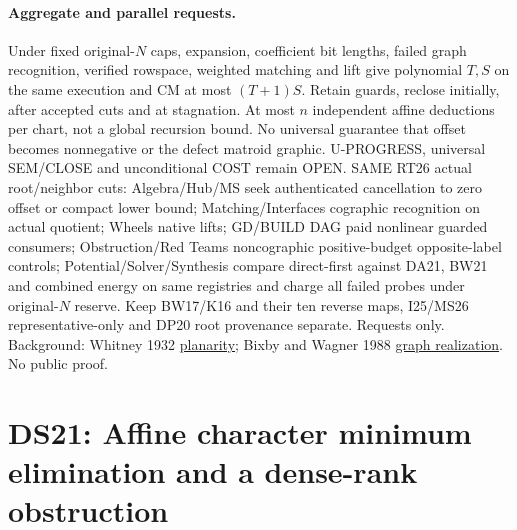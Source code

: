 \documentclass[11pt]{article}
\begin{document}
\paragraph{Aggregate and parallel requests.} Under fixed original-$N$ caps, expansion, coefficient bit lengths, failed graph recognition, verified rowspace, weighted matching and lift give polynomial $T,S$ on the same execution and CM at most $(T+1)S$. Retain guards, reclose initially, after accepted cuts and at stagnation. At most $n$ independent affine deductions per chart, not a global recursion bound. No universal guarantee that offset becomes nonnegative or the defect matroid graphic. U-PROGRESS, universal SEM/CLOSE and unconditional COST remain OPEN. SAME RT26 actual root/neighbor cuts: Algebra/Hub/MS seek authenticated cancellation to zero offset or compact lower bound; Matching/Interfaces cographic recognition on actual quotient; Wheels native lifts; GD/BUILD DAG paid nonlinear guarded consumers; Obstruction/Red Teams noncographic positive-budget opposite-label controls; Potential/Solver/Synthesis compare direct-first against DA21, BW21 and combined energy on same registries and charge all failed probes under original-$N$ reserve. Keep BW17/K16 and their ten reverse maps, I25/MS26 representative-only and DP20 root provenance separate. Requests only. Background: Whitney 1932 \href{https://doi.org/10.1090/S0002-9947-1932-1501641-2}{planarity}; Bixby and Wagner 1988 \href{https://doi.org/10.1287/moor.13.1.99}{graph realization}. No public proof.


\section{DS21: Affine character minimum elimination and a dense-rank obstruction}\label{sec:ds21}
\end{document}
